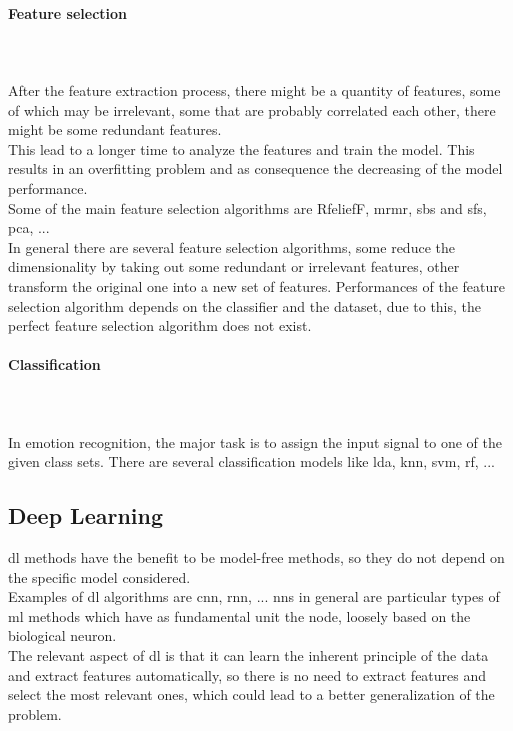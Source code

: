 \paragraph{Feature selection}
\mbox{} \\ \\ \indent
After the feature extraction process, there might be a quantity of features, some of which may be irrelevant, some that are probably correlated each other, there might be some redundant features.
\\
This lead to a longer time to analyze the features and train the model. This results in an overfitting problem and as consequence the decreasing of the model performance.
\\
Some of the main feature selection algorithms are RfeliefF, \gls{mrmr}, \gls{sbs} and \gls{sfs}, \gls{pca}, ...
\\ \indent
In general there are several feature selection algorithms, some reduce the dimensionality by taking out some redundant or irrelevant features, other transform the original one into a new set of features. Performances of the feature selection algorithm depends on the classifier and the dataset, due to this, the perfect feature selection algorithm does not exist.

\paragraph{Classification}
\mbox{} \\ \\ \indent
In emotion recognition, the major task is to assign the input signal to one of the given class sets. There are several classification models like \gls{lda}, \gls{knn}, \gls{svm}, \gls{rf}, ...

\subsection{Deep Learning}
\gls{dl} methods have the benefit to be model-free methods, so they do not depend on the specific model considered.
\\
Examples of \gls{dl} algorithms are \gls{cnn}, \gls{rnn}, ... \gls{nn}s in general are particular types of \gls{ml} methods which have as fundamental unit the node, loosely based on the biological neuron. 
\\ \indent
The relevant aspect of \gls{dl} is that it can learn the inherent principle of the data and extract features automatically, so there is no need to extract features and select the most relevant ones, which could lead to a better generalization of the problem.

